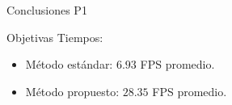 \begin{frame}{Conclusiones P1}

  \begin{block}{Objetivas}
      Tiempos:
      \begin{itemize}
	  \item Método estándar: $6.93$ FPS promedio.
	  \item Método propuesto: $28.35$ FPS promedio.
      \end{itemize}
  \end{block}
  

\end{frame}
